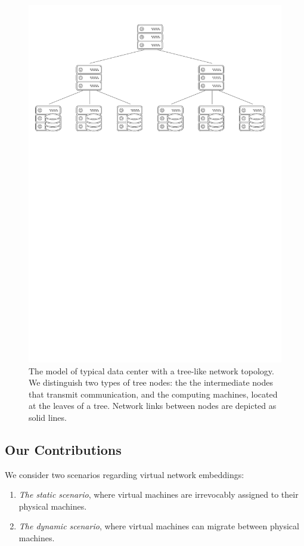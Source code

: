 \begin{figure}[t]
\centering
\includegraphics[width=0.79\columnwidth]{figs/tree-topology.pdf}
\caption{The model of typical data center with a tree-like network topology. We distinguish two types of tree nodes: the the intermediate nodes that transmit communication, and the computing machines, located at the leaves of a tree. Network links between nodes are depicted as solid lines.}\label{fig:tree-topology}
\vspace{-1em}
\end{figure}


\subsection{Our Contributions}

We consider two scenarios regarding virtual network embeddings:
\begin{enumerate}
  \item \emph{The static scenario}, where virtual machines are irrevocably assigned to their physical machines.
  \item \emph{The dynamic scenario}, where virtual machines can migrate between physical machines.
\end{enumerate}

